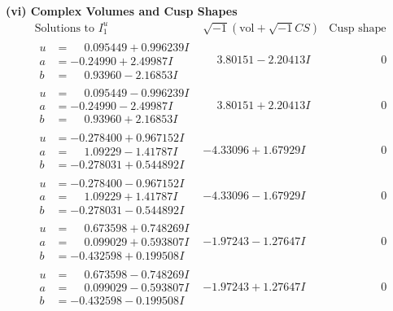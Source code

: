 \documentclass[1p]{elsarticle_modified}
\theoremstyle{definition}
\newcommand{\I}{\sqrt{-1}}
\begin{document}
\newpage\flushleft \textbf{(vi) Complex Volumes and Cusp Shapes}
$$\begin{array}{c|c|c}  
\text{Solutions to }I^u_{1}& \I (\text{vol} + \sqrt{-1}CS) & \text{Cusp shape}\\
 \hline 
\begin{aligned}
u &= \phantom{-}0.095449 + 0.996239 I \\
a &= -0.24990 + 2.49987 I \\
b &= \phantom{-}0.93960 - 2.16853 I\end{aligned}
 & \phantom{-}3.80151 - 2.20413 I & \phantom{-0.000000 } 0 \\ \hline\begin{aligned}
u &= \phantom{-}0.095449 - 0.996239 I \\
a &= -0.24990 - 2.49987 I \\
b &= \phantom{-}0.93960 + 2.16853 I\end{aligned}
 & \phantom{-}3.80151 + 2.20413 I & \phantom{-0.000000 } 0 \\ \hline\begin{aligned}
u &= -0.278400 + 0.967152 I \\
a &= \phantom{-}1.09229 - 1.41787 I \\
b &= -0.278031 + 0.544892 I\end{aligned}
 & -4.33096 + 1.67929 I & \phantom{-0.000000 } 0 \\ \hline\begin{aligned}
u &= -0.278400 - 0.967152 I \\
a &= \phantom{-}1.09229 + 1.41787 I \\
b &= -0.278031 - 0.544892 I\end{aligned}
 & -4.33096 - 1.67929 I & \phantom{-0.000000 } 0 \\ \hline\begin{aligned}
u &= \phantom{-}0.673598 + 0.748269 I \\
a &= \phantom{-}0.099029 + 0.593807 I \\
b &= -0.432598 + 0.199508 I\end{aligned}
 & -1.97243 - 1.27647 I & \phantom{-0.000000 } 0 \\ \hline\begin{aligned}
u &= \phantom{-}0.673598 - 0.748269 I \\
a &= \phantom{-}0.099029 - 0.593807 I \\
b &= -0.432598 - 0.199508 I\end{aligned}
 & -1.97243 + 1.27647 I & \phantom{-0.000000 } 0 \\ \hline\begin{aligned}

\end{aligned}
\end{array}$$
\end{document}

